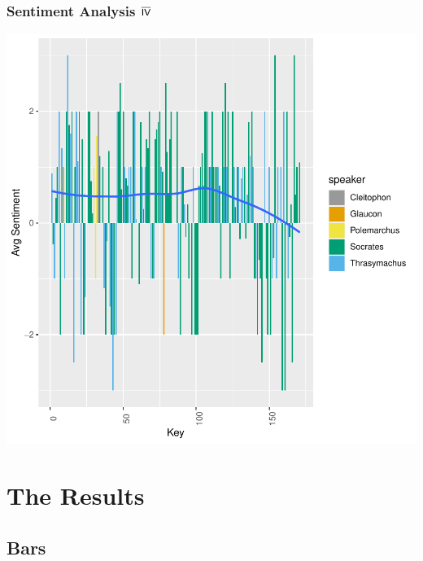 \documentclass{beamer}
\renewcommand{\Roman}[1]{$\overline{\textsf{\small{\MakeUppercase{\romannumeral #1}}}}$}
\begin{document}
\begin{frame}[fragile]
\frametitle{Sentiment Analysis \Roman{4}}
\includegraphics{GreatSlideshow-016}
\end{frame}



\section{The Results} %

\subsection{Bars}  %
\end{document}
